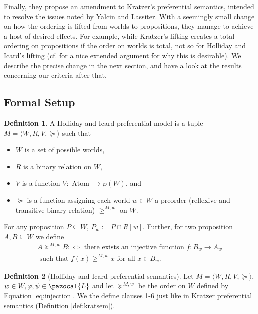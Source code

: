 \documentclass{article}
\theoremstyle{definition}
\newtheorem{definition}{Definition}
\renewcommand{\L}{\pazocal{L}}
\begin{document}
Finally, they propose an amendment to Kratzer's preferential semantics, intended to resolve the issues noted by Yalcin and Lassiter. With a seemingly small change on how the ordering is lifted from worlds to propositions, they manage to achieve a host of desired effects. For example, while Kratzer's lifting creates a total ordering on propositions if the order on worlds is total, not so for Holliday and Icard's lifting (cf. \parencite[][p.~525]{holliday13_measur} for a nice extended argument for why this is desirable). We describe the precise change in the next section, and have a look at the results concerning our criteria after that.

\subsection{Formal Setup}
\begin{definition}
    A Holliday and Icard preferential model is a tuple $M = {\langle
      W,R,V,\succeq\rangle}$ such that
    \begin{itemize}[nosep]
        \renewcommand\labelitemi{--}
      \item $W$ is a set of possible worlds,
      \item $R$ is a binary relation on $W$,
      \item $V$ is a function $V: \text{ Atom } \rightarrow \wp(W)$, and
      \item $\succeq$ is a function assigning each world $w \in W$ a preorder
        (reflexive and transitive binary relation) $\geq^{M,w}$ on $W$. 
    \end{itemize}
\end{definition}
For any proposition $P \subseteq W$, $P_w := P \cap R[w]$. Further, for two proposition $A,B \subseteq W$ we define
\begin{multline}
    \label{eq:injection}A \succeq^{M,w} B :\iff \text{ there exists an injective function } f: B_w \rightarrow A_w \\ \text{ such that } f(x) \geq^{M,w} x \text{ for all } x \in B_w.
\end{multline}

\begin{definition}[Holliday and Icard preferential semantics] Let $M = {\langle
      W,R,V,\succeq \rangle}$, $w \in W, \varphi,\psi \in \L$ and let $\succeq^{M,w}$ be the order on $W$ defined by Equation \ref{eq:injection}. We the define clauses 1-6 just like in Kratzer preferential semantics (Definition \ref{def:kratsem}).
\end{definition}
\end{document}

